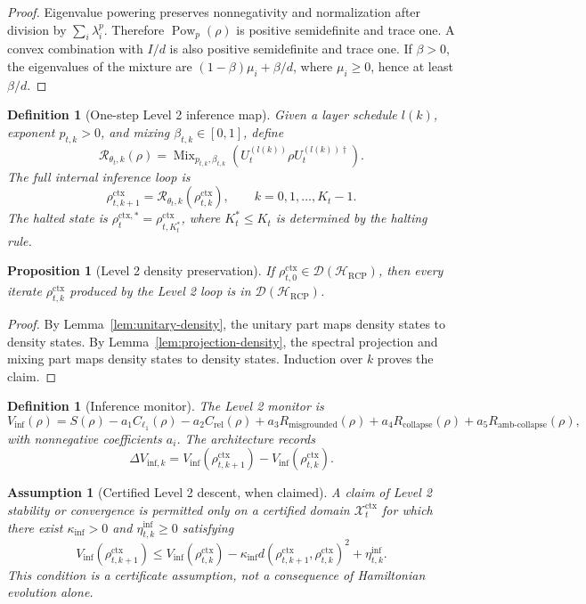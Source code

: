 \documentclass[11pt,a4paper]{article}
\newtheorem{proposition}[theorem]{Proposition}
\newtheorem{definition}[theorem]{Definition}
\newtheorem{assumption}[theorem]{Assumption}
\newcommand{\D}{\mathcal D}
\newcommand{\Hcal}{\mathcal H}
\newcommand{\Rcal}{\mathcal R}
\newcommand{\Xcal}{\mathcal X}
\newcommand{\RCP}{\mathrm{RCP}}
\newcommand{\ctx}{\mathrm{ctx}}
\newcommand{\rel}{\mathrm{rel}}
\newcommand{\collapse}{\mathrm{collapse}}
\newcommand{\misgrounded}{\mathrm{misgrounded}}
\newcommand{\ambcollapse}{\mathrm{amb\mbox{-}collapse}}
\begin{document}
\begin{proof}
Eigenvalue powering preserves nonnegativity and normalization after division by \(\sum_i\lambda_i^p\).  Therefore \(\operatorname{Pow}_p(\rho)\) is positive semidefinite and trace one.  A convex combination with \(I/d\) is also positive semidefinite and trace one.  If \(\beta>0\), the eigenvalues of the mixture are \((1-\beta)\mu_i+\beta/d\), where \(\mu_i\ge0\), hence at least \(\beta/d\).
\end{proof}

\begin{definition}[One-step Level 2 inference map]
Given a layer schedule \(l(k)\), exponent \(p_{t,k}>0\), and mixing \(\beta_{t,k}\in[0,1]\), define
\[
\Rcal_{\theta_t,k}(\rho)=
\operatorname{Mix}_{p_{t,k},\beta_{t,k}}
\left(U_t^{(l(k))}\rho U_t^{(l(k))\dagger}\right).
\]
The full internal inference loop is
\[
\rho_{t,k+1}^{\ctx}=\Rcal_{\theta_t,k}(\rho_{t,k}^{\ctx}),
\qquad k=0,1,\ldots,K_t-1.
\]
The halted state is \(\rho_t^{\ctx,*}=\rho_{t,K_t^*}^{\ctx}\), where \(K_t^*\le K_t\) is determined by the halting rule.
\end{definition}

\begin{proposition}[Level 2 density preservation]
\label{prop:level2-density-preservation}
If \(\rho_{t,0}^{\ctx}\in\D(\Hcal_{\RCP})\), then every iterate \(\rho_{t,k}^{\ctx}\) produced by the Level 2 loop is in \(\D(\Hcal_{\RCP})\).
\end{proposition}

\begin{proof}
By Lemma~\ref{lem:unitary-density}, the unitary part maps density states to density states.  By Lemma~\ref{lem:projection-density}, the spectral projection and mixing part maps density states to density states.  Induction over \(k\) proves the claim.
\end{proof}

\begin{definition}[Inference monitor]
The Level 2 monitor is
\[
V_{\mathrm{inf}}(\rho)=
S(\rho)-a_1C_{\ell_1}(\rho)-a_2C_{\rel}(\rho)
+a_3R_{\misgrounded}(\rho)+a_4R_{\collapse}(\rho)+a_5R_{\ambcollapse}(\rho),
\]
with nonnegative coefficients \(a_i\).  The architecture records
\[
\Delta V_{\mathrm{inf},k}=V_{\mathrm{inf}}(\rho_{t,k+1}^{\ctx})-V_{\mathrm{inf}}(\rho_{t,k}^{\ctx}).
\]
\end{definition}

\begin{assumption}[Certified Level 2 descent, when claimed]
A claim of Level 2 stability or convergence is permitted only on a certified domain \(\Xcal_t^{\ctx}\) for which there exist \(\kappa_{\inf}>0\) and \(\eta_{t,k}^{\inf}\ge0\) satisfying
\[
V_{\mathrm{inf}}(\rho_{t,k+1}^{\ctx})
\le
V_{\mathrm{inf}}(\rho_{t,k}^{\ctx})
-\kappa_{\inf}d(\rho_{t,k+1}^{\ctx},\rho_{t,k}^{\ctx})^2
+\eta_{t,k}^{\inf}.
\]
This condition is a certificate assumption, not a consequence of Hamiltonian evolution alone.
\end{assumption}
\end{document}
